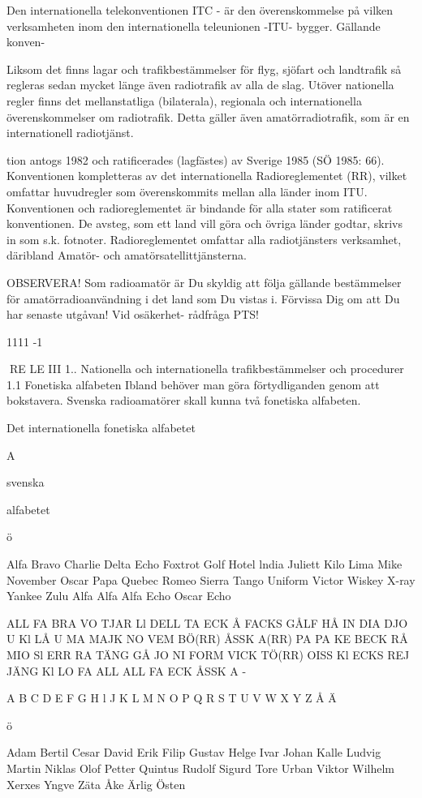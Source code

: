 \documentclass[a4paper,twoside,twocolumn,openright]{book}
\begin{document}
{{{{{Den internationella telekonventionen ITC - är den överenskommelse på vilken
verksamheten inom den internationella teleunionen -ITU- bygger. Gällande konven-

Liksom det finns lagar och trafikbestämmelser för flyg, sjöfart och landtrafik så regleras sedan mycket länge även radiotrafik av
alla de slag. Utöver nationella regler finns
det mellanstatliga (bilaterala), regionala och
internationella överenskommelser om radiotrafik. Detta gäller även amatörradiotrafik,
som är en internationell radiotjänst.

tion antogs 1982 och ratificerades (lagfästes) av Sverige 1985 (SÖ 1985: 66). Konventionen kompletteras av det internationella Radioreglementet (RR), vilket omfattar
huvudregler som överenskommits mellan
alla länder inom ITU.
Konventionen och radioreglementet är
bindande för alla stater som ratificerat
konventionen. De avsteg, som ett land vill
göra och övriga länder godtar, skrivs in som
s.k. fotnoter. Radioreglementet omfattar alla
radiotjänsters verksamhet, däribland Amatör- och amatörsatellittjänsterna.

OBSERVERA!
Som radioamatör är Du skyldig att följa gällande bestämmelser
för amatörradioanvändning i det land som Du vistas i.
Förvissa Dig om att Du har senaste utgåvan!
Vid osäkerhet- rådfråga PTS!

1111 -1

RE LE
III 1.. Nationella och internationella trafikbestämmelser
och procedurer
1.1 Fonetiska alfabeten
Ibland behöver man göra förtydliganden genom att bokstavera.
Svenska radioamatörer skall kunna två fonetiska alfabeten.

Det internationella fonetiska alfabetet

A

svenska

alfabetet

ö

Alfa
Bravo
Charlie
Delta
Echo
Foxtrot
Golf
Hotel
lndia
Juliett
Kilo
Lima
Mike
November
Oscar
Papa
Quebec
Romeo
Sierra
Tango
Uniform
Victor
Wiskey
X-ray
Yankee
Zulu
Alfa Alfa
Alfa Echo
Oscar Echo

ALL FA
BRA VO
TJAR Ll
DELL TA
ECK Å
FACKS
GÅLF
HÅ
IN DIA
DJO U
Kl LÅ
U MA
MAJK
NO VEM BÖ(RR)
ÅSSK A(RR)
PA PA
KE BECK
RÅ MIO
Sl ERR RA
TÄNG GÅ
JO NI FORM
VICK TÖ(RR)
OISS Kl
ECKS REJ
JÄNG Kl
LO
FA ALL
ALL FA ECK
ÅSSK A -

A
B
C
D
E
F
G
H
l
J
K
L
M
N
O
P
Q
R
S
T
U
V
W
X
Y
Z
Å
Ä

ö

Adam
Bertil
Cesar
David
Erik
Filip
Gustav
Helge
Ivar
Johan
Kalle
Ludvig
Martin
Niklas
Olof
Petter
Quintus
Rudolf
Sigurd
Tore
Urban
Viktor
Wilhelm
Xerxes
Yngve
Zäta
Åke
Ärlig
Östen

}}}}}
\end{document}
